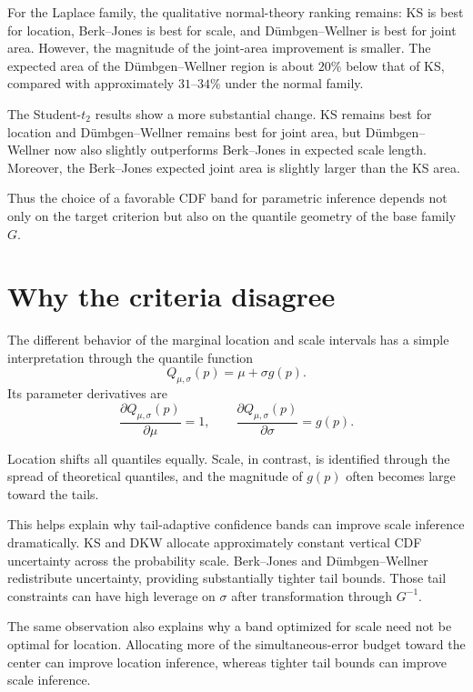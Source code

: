 \documentclass[11pt]{article}
\begin{document}
For the Laplace family, the qualitative normal-theory ranking remains:
KS is best for location, Berk--Jones is best for scale, and
Dümbgen--Wellner is best for joint area.  However, the magnitude of the
joint-area improvement is smaller.  The expected area of the
Dümbgen--Wellner region is about $20\%$ below that of KS, compared with
approximately $31$--$34\%$ under the normal family.

The Student-$t_2$ results show a more substantial change.  KS remains
best for location and Dümbgen--Wellner remains best for joint area, but
Dümbgen--Wellner now also slightly outperforms Berk--Jones in expected
scale length.  Moreover, the Berk--Jones expected joint area is slightly
larger than the KS area.

Thus the choice of a favorable CDF band for parametric inference
depends not only on the target criterion but also on the quantile
geometry of the base family $G$.


\section{Why the criteria disagree}

The different behavior of the marginal location and scale intervals has
a simple interpretation through the quantile function
\[
    Q_{\mu,\sigma}(p)
    =
    \mu+\sigma g(p).
\]
Its parameter derivatives are
\begin{equation}
    \frac{\partial Q_{\mu,\sigma}(p)}
         {\partial\mu}
    =
    1,
    \qquad
    \frac{\partial Q_{\mu,\sigma}(p)}
         {\partial\sigma}
    =
    g(p).
    \label{eq:derivatives}
\end{equation}

Location shifts all quantiles equally.  Scale, in contrast, is
identified through the spread of theoretical quantiles, and the
magnitude of $g(p)$ often becomes large toward the tails.

This helps explain why tail-adaptive confidence bands can improve scale
inference dramatically.  KS and DKW allocate approximately constant
vertical CDF uncertainty across the probability scale.  Berk--Jones and
Dümbgen--Wellner redistribute uncertainty, providing substantially
tighter tail bounds.  Those tail constraints can have high leverage on
$\sigma$ after transformation through $G^{-1}$.

The same observation also explains why a band optimized for scale need
not be optimal for location.  Allocating more of the simultaneous-error
budget toward the center can improve location inference, whereas tighter
tail bounds can improve scale inference.
\end{document}
